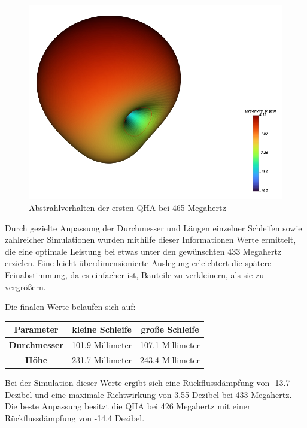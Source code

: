 \begin{figure} [H]
	\centering
	\includegraphics[width=.75\linewidth]{../ref/radiation_pattern_old_qfh.png}
	\caption{Abstrahlverhalten der ersten QHA bei 465 Megahertz}
	\label{fig:rp_old_qha}
\end{figure}

Durch gezielte Anpassung der Durchmesser und Längen einzelner Schleifen sowie zahlreicher Simulationen wurden mithilfe dieser Informationen Werte ermittelt, die eine optimale Leistung bei etwas unter den gewünschten 433 Megahertz erzielen. Eine leicht überdimensionierte Auslegung erleichtert die spätere Feinabstimmung, da es einfacher ist, Bauteile zu verkleinern, als sie zu vergrößern.

Die finalen Werte belaufen sich auf:

\begin{center}
	\begin{tabular}{|c|c|c|}
		\hline
		\textbf{Parameter} & \textbf{kleine Schleife} & \textbf{große Schleife} \\
		\hline
		\textbf{Durchmesser} & 101.9 Millimeter & 107.1 Millimeter \\
		\hline
		\textbf{Höhe} & 231.7 Millimeter & 243.4 Millimeter \\
		\hline
	\end{tabular}
\end{center} 

Bei der Simulation dieser Werte ergibt sich eine Rückflussdämpfung von -13.7 Dezibel und eine maximale Richtwirkung von 3.55 Dezibel bei 433 Megahertz. Die beste Anpassung besitzt die QHA bei 426 Megahertz mit einer Rückflussdämpfung von -14.4 Dezibel.

